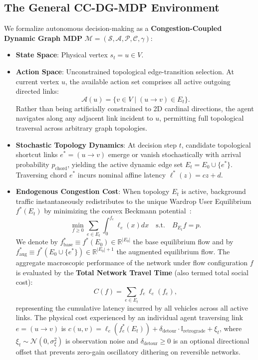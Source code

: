 \documentclass[11pt,a4paper]{article}
\begin{document}
\subsection{The General CC-DG-MDP Environment}
We formalize autonomous decision-making as a \textbf{Congestion-Coupled Dynamic Graph MDP} $\mathcal{M} = (\mathcal{S}, \mathcal{A}, \mathcal{P}, \mathcal{C}, \gamma)$:
\begin{itemize}
    \item \textbf{State Space}: Physical vertex $s_t = u \in V$.
    \item \textbf{Action Space}: Unconstrained topological edge-transition selection. At current vertex $u$, the available action set comprises all active outgoing directed links:
    \begin{equation}
    \mathcal{A}(u) = \{ v \in V \mid (u \to v) \in E_t \}.
    \end{equation}
    Rather than being artificially constrained to 2D cardinal directions, the agent navigates along any adjacent link incident to $u$, permitting full topological traversal across arbitrary graph topologies.
    \item \textbf{Stochastic Topology Dynamics}: At decision step $t$, candidate topological shortcut links $e^* = (u \to v)$ emerge or vanish stochastically with arrival probability $p_{\text{chord}}$, yielding the active dynamic edge set $E_t = E_0 \cup \{e^*\}$. Traversing chord $e^*$ incurs nominal affine latency $\ell^*(z) = c z + d$.
    \item \textbf{Endogenous Congestion Cost}: When topology $E_t$ is active, background traffic instantaneously redistributes to the unique Wardrop User Equilibrium $f^*(E_t)$ by minimizing the convex Beckmann potential~\cite{beckmann1956studies}:
    \begin{equation}
    \label{eq:beckmann}
    \min_{f \ge 0} \sum_{e \in E_t} \int_0^{f_e} \ell_e(x) dx \quad \text{s.t.} \quad B_{E_t} f = p.
    \end{equation}
    We denote by $f_{\text{base}}^* \equiv f^*(E_0) \in \mathbb{R}^{|E_0|}$ the base equilibrium flow and by $f_{\text{aug}}^* \equiv f^*(E_0 \cup \{e^*\}) \in \mathbb{R}^{|E_0|+1}$ the augmented equilibrium flow. The aggregate macroscopic performance of the network under flow configuration $f$ is evaluated by the \textbf{Total Network Travel Time} (also termed total social cost):
    \begin{equation}
    \label{eq:total_travel_time}
    C(f) = \sum_{e \in E_t} f_e \, \ell_e(f_e),
    \end{equation}
    representing the cumulative latency incurred by all vehicles across all active links. The physical cost experienced by an individual agent traversing link $e = (u \to v)$ is $c(u, v) = \ell_e(f_e^*(E_t)) + \delta_{\text{detour}} \cdot \mathbb{I}_{\text{retrograde}} + \xi_t$, where $\xi_t \sim \mathcal{N}(0, \sigma_{\xi}^2)$ is observation noise and $\delta_{\text{detour}} \ge 0$ is an optional directional offset that prevents zero-gain oscillatory dithering on reversible networks.
\end{itemize}
\end{document}
